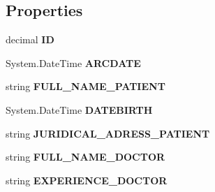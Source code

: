 \subsection*{Properties}
\begin{CompactItemize}
\item 
decimal \textbf{ID}\hspace{0.3cm}{\tt  [get, set]}\label{class_automatic_medical_system_1_1_data_set1_1_1_v_a_r_c_f_a_m_i_l_y_d_o_c_t_o_r_r_e_c_o_r_d_s_row_280aeafac4a1a1cf28fd0b82c3822faa}

\item 
System.DateTime \textbf{ARCDATE}\hspace{0.3cm}{\tt  [get, set]}\label{class_automatic_medical_system_1_1_data_set1_1_1_v_a_r_c_f_a_m_i_l_y_d_o_c_t_o_r_r_e_c_o_r_d_s_row_177b80572db5087cb8c470b9afd392f8}

\item 
string \textbf{FULL\_\-NAME\_\-PATIENT}\hspace{0.3cm}{\tt  [get, set]}\label{class_automatic_medical_system_1_1_data_set1_1_1_v_a_r_c_f_a_m_i_l_y_d_o_c_t_o_r_r_e_c_o_r_d_s_row_17630bba9920ddedd32057a1962b9659}

\item 
System.DateTime \textbf{DATEBIRTH}\hspace{0.3cm}{\tt  [get, set]}\label{class_automatic_medical_system_1_1_data_set1_1_1_v_a_r_c_f_a_m_i_l_y_d_o_c_t_o_r_r_e_c_o_r_d_s_row_2191dde2676e95e9567faf95604262af}

\item 
string \textbf{JURIDICAL\_\-ADRESS\_\-PATIENT}\hspace{0.3cm}{\tt  [get, set]}\label{class_automatic_medical_system_1_1_data_set1_1_1_v_a_r_c_f_a_m_i_l_y_d_o_c_t_o_r_r_e_c_o_r_d_s_row_302263eb310a70f6bf065a552e641020}

\item 
string \textbf{FULL\_\-NAME\_\-DOCTOR}\hspace{0.3cm}{\tt  [get, set]}\label{class_automatic_medical_system_1_1_data_set1_1_1_v_a_r_c_f_a_m_i_l_y_d_o_c_t_o_r_r_e_c_o_r_d_s_row_8a9863bedfdb9312d9ece281f6d33ae5}

\item 
string \textbf{EXPERIENCE\_\-DOCTOR}\hspace{0.3cm}{\tt  [get, set]}\label{class_automatic_medical_system_1_1_data_set1_1_1_v_a_r_c_f_a_m_i_l_y_d_o_c_t_o_r_r_e_c_o_r_d_s_row_1d81ac508a70e467deaa457254ab6dff}

\end{CompactItemize}


